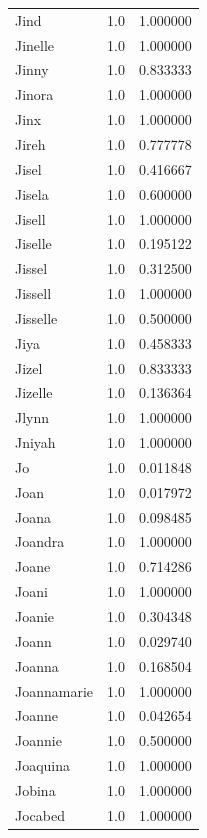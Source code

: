 \documentclass[
  letterpaper,
  DIV=11,
  numbers=noendperiod]{scrreprt}
\begin{document}
\begin{tabular}{lrr}
Jind            &   1.0 &   1.000000 \\
Jinelle         &   1.0 &   1.000000 \\
Jinny           &   1.0 &   0.833333 \\
Jinora          &   1.0 &   1.000000 \\
Jinx            &   1.0 &   1.000000 \\
Jireh           &   1.0 &   0.777778 \\
Jisel           &   1.0 &   0.416667 \\
Jisela          &   1.0 &   0.600000 \\
Jisell          &   1.0 &   1.000000 \\
Jiselle         &   1.0 &   0.195122 \\
Jissel          &   1.0 &   0.312500 \\
Jissell         &   1.0 &   1.000000 \\
Jisselle        &   1.0 &   0.500000 \\
Jiya            &   1.0 &   0.458333 \\
Jizel           &   1.0 &   0.833333 \\
Jizelle         &   1.0 &   0.136364 \\
Jlynn           &   1.0 &   1.000000 \\
Jniyah          &   1.0 &   1.000000 \\
Jo              &   1.0 &   0.011848 \\
Joan            &   1.0 &   0.017972 \\
Joana           &   1.0 &   0.098485 \\
Joandra         &   1.0 &   1.000000 \\
Joane           &   1.0 &   0.714286 \\
Joani           &   1.0 &   1.000000 \\
Joanie          &   1.0 &   0.304348 \\
Joann           &   1.0 &   0.029740 \\
Joanna          &   1.0 &   0.168504 \\
Joannamarie     &   1.0 &   1.000000 \\
Joanne          &   1.0 &   0.042654 \\
Joannie         &   1.0 &   0.500000 \\
Joaquina        &   1.0 &   1.000000 \\
Jobina          &   1.0 &   1.000000 \\
Jocabed         &   1.0 &   1.000000 \\

\end{tabular}
\end{document}
